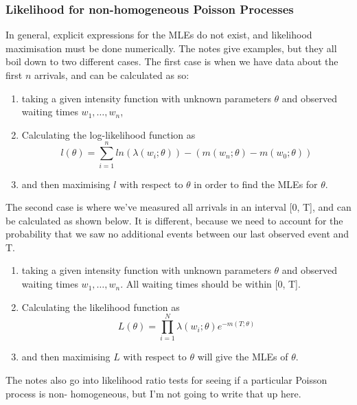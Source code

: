     \subsubsection{Likelihood for non-homogeneous Poisson Processes}
    In general, explicit expressions for the MLEs do not exist, and likelihood maximisation must be 
    done numerically.
    The notes give examples, but they all boil down to two different cases. The first case is when we have data about the first \(n\) arrivals, and can be calculated as so:
    \begin{enumerate}
        \item taking a given intensity function with unknown parameters \(\theta\) and observed waiting times \(w_1, \dots, w_n\),
        \item Calculating the log-likelihood function as 
            \begin{equation*}
                l(\theta) = \sum_{i=1}^{n}ln\left(\lambda(w_i; \theta)\right) - 
                \left(m(w_n; \theta) - m(w_0; \theta)\right)
            \end{equation*}
        \item and then maximising \(l\) with respect to \(\theta\) in order to find the MLEs for \(\theta\).
    \end{enumerate}

    The second case is where we've measured all arrivals in an interval [0, T], and can be 
    calculated as shown below. It is different, because we need to account for the probability that 
    we saw no additional events between our last observed event and T.
    \begin{enumerate}
        \item taking a given intensity function with unknown parameters \(\theta\) and observed waiting times \(w_1, \dots, w_n\). All waiting times should be within [0, T].
        \item Calculating the likelihood function as 
            \begin{equation*}
                L(\theta) = \prod_{i=1}^{N}\lambda(w_i; \theta) e^{-m(T; \theta)}
            \end{equation*}
        \item and then maximising \(L\) with respect to \(\theta\) will give the MLEs of \(\theta\).
    \end{enumerate}

    The notes also go into likelihood ratio tests for seeing if a particular Poisson process is non-
    homogeneous, but I'm not going to write that up here.
